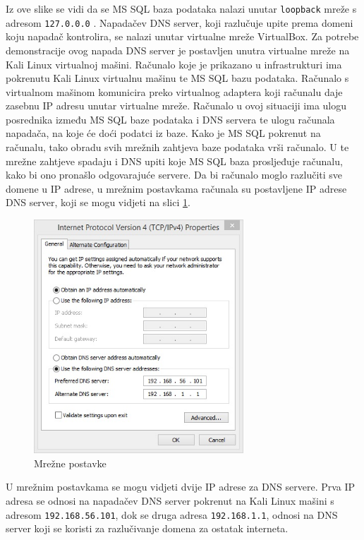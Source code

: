 \documentclass[12pt, oneside, onecolumn]{book}
\begin{document}
{Iz ove slike se vidi da se MS SQL baza podataka nalazi unutar \texttt{loopback} mreže s adresom \texttt{127.0.0.0} . Napadačev DNS server, koji razlučuje upite prema domeni koju napadač kontrolira, se nalazi unutar virtualne mreže VirtualBox. Za potrebe demonstracije ovog napada DNS server je postavljen unutra virtualne mreže na Kali Linux virtualnoj mašini. Računalo koje je prikazano u infrastrukturi ima pokrenutu Kali Linux virtualnu mašinu te MS SQL bazu podataka. Računalo s virtualnom mašinom komunicira preko virtualnog adaptera koji računalu daje zasebnu IP adresu unutar virtualne mreže. Računalo u ovoj situaciji ima ulogu posrednika između MS SQL baze podataka i DNS servera te ulogu računala napadača, na koje će doći podatci iz baze. Kako je MS SQL pokrenut na računalu, tako obradu svih mrežnih zahtjeva baze podataka vrši računalo. U te mrežne zahtjeve spadaju i DNS upiti koje MS SQL baza prosljeđuje računalu, kako bi ono pronašlo odgovarajuće servere. Da bi računalo moglo razlučiti sve domene u IP adrese, u mrežnim postavkama računala su postavljene IP adrese DNS server, koji se mogu vidjeti na slici \ref{fig:bsqli_ns}.

\begin{figure}[H]
	\begin{center}
		\includegraphics[width=0.7\textwidth]{bsqli_ns.jpg}
		\caption{Mrežne postavke} \label{fig:bsqli_ns}
	\end{center}
\end{figure}

U mrežnim postavkama se mogu vidjeti dvije IP adrese za DNS servere. Prva IP adresa se odnosi na napadačev DNS server pokrenut na Kali Linux mašini s adresom \texttt{192.168.56.101}, dok se druga adresa \texttt{192.168.1.1}, odnosi na DNS server koji se koristi za razlučivanje domena za ostatak interneta.

}
\end{document}
